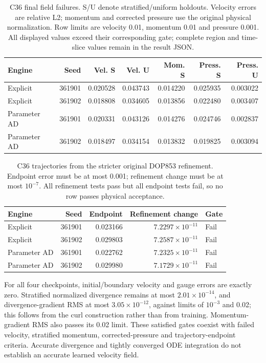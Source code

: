 \documentclass[11pt]{article}
\begin{document}
\begin{table}[htbp]\centering\small
\setlength{\tabcolsep}{4pt}
\caption{C36 final field failures. S/U denote stratified/uniform holdouts. Velocity errors are relative L2; momentum and corrected pressure use the original physical normalization. Row limits are velocity 0.01, momentum 0.01 and pressure 0.001. All displayed values exceed their corresponding gate; complete region and time-slice values remain in the result JSON.}
\label{tab:c36fields}
\begin{tabular}{lrrrrrr}\toprule
Engine & Seed & Vel. S & Vel. U & Mom. S & Press. S & Press. U\\\midrule
Explicit & 361901 & 0.020528 & 0.043743 & 0.014220 & 0.025935 & 0.003022\\
Explicit & 361902 & 0.018808 & 0.034605 & 0.013856 & 0.022480 & 0.003407\\
Parameter AD & 361901 & 0.020331 & 0.043126 & 0.014276 & 0.024746 & 0.002837\\
Parameter AD & 361902 & 0.018497 & 0.034154 & 0.013832 & 0.019825 & 0.003094
\\\bottomrule\end{tabular}
\end{table}
\begin{table}[htbp]\centering\small
\setlength{\tabcolsep}{4pt}
\caption{C36 trajectories from the stricter original DOP853 refinement. Endpoint error must be at most 0.001; refinement change must be at most $10^{-7}$. All refinement tests pass but all endpoint tests fail, so no row passes physical acceptance.}
\label{tab:c36trajectories}
\begin{tabular}{lrrrl}\toprule
Engine & Seed & Endpoint & Refinement change & Gate\\\midrule
Explicit & 361901 & 0.023166 & $7.2297\times10^{-11}$ & Fail\\
Explicit & 361902 & 0.029803 & $7.2587\times10^{-11}$ & Fail\\
Parameter AD & 361901 & 0.022762 & $7.2325\times10^{-11}$ & Fail\\
Parameter AD & 361902 & 0.029980 & $7.1729\times10^{-11}$ & Fail
\\\bottomrule\end{tabular}
\end{table}
For all four checkpoints, initial/boundary velocity and gauge errors are
exactly zero. Stratified normalized divergence remains at most
$2.01\times10^{-14}$, and divergence-gradient RMS at most
$3.05\times10^{-12}$, against limits of $10^{-3}$ and 0.02; this follows
from the curl construction rather than from training. Momentum-gradient
RMS also passes its 0.02 limit. These satisfied gates coexist with failed
velocity, stratified momentum, corrected-pressure and trajectory-endpoint
criteria. Accurate divergence and tightly converged ODE integration do not
establish an accurate learned velocity field.
\end{document}
